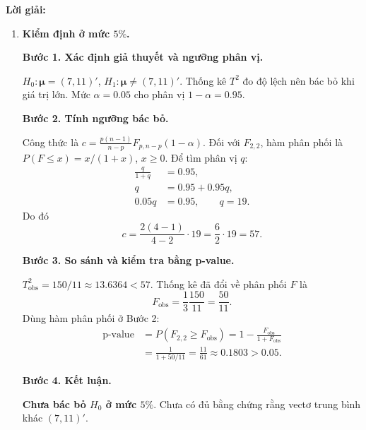 \documentclass[11pt,a4paper]{article}
\renewcommand{\boldsymbol}[1]{\symbf{#1}}
\newenvironment{solution}{%
  \par\medskip\noindent\textbf{Lời giải:}\par\nobreak\smallskip\noindent\ignorespaces
}{\par}
\newcommand{\answer}[1]{\boxed{#1}}
\newcommand{\step}[2]{\par\medskip\noindent\textbf{Bước #1. #2}\par\nopagebreak[4]\smallskip\noindent}
\begin{document}
\begin{solution}
\begin{enumerate}[label=\textbf{\alph*)}]
\begin{align*}
\frac{n-p}{p(n-1)}&=\frac26=\frac13.
\end{align*}
\step{3}{Kết luận.}
\[
\answer{\frac{T^2}{3}\sim F_{2,2}\quad\text{khi }H_0\text{ đúng}.}
\]
\item \textbf{Kiểm định ở mức $5\%$.}\par\nopagebreak[4]
\step{1}{Xác định giả thuyết và ngưỡng phân vị.}
$H_0:\boldsymbol{\mu}=(7,11)'$, $H_1:\boldsymbol{\mu}\ne(7,11)'$.
Thống kê $T^2$ đo độ lệch nên bác bỏ khi giá trị lớn.
Mức $\alpha=0.05$ cho phân vị $1-\alpha=0.95$.
\step{2}{Tính ngưỡng bác bỏ.}
Công thức là $c=\frac{p(n-1)}{n-p}F_{p,n-p}(1-\alpha)$.
Đối với $F_{2,2}$, hàm phân phối là $P(F\le x)=x/(1+x)$, $x\ge0$.
Để tìm phân vị $q$:
\begin{align*}
\frac{q}{1+q}&=0.95,\\
q&=0.95+0.95q,\\
0.05q&=0.95,\qquad q=19.
\end{align*}
Do đó
\[
c=\frac{2(4-1)}{4-2}\cdot19=\frac62\cdot19=57.
\]
\step{3}{So sánh và kiểm tra bằng p-value.}
$T^2_{\mathrm{obs}}=150/11\approx13.6364<57$.
Thống kê đã đổi về phân phối $F$ là
\[
F_{\mathrm{obs}}=\frac13\frac{150}{11}=\frac{50}{11}.
\]
Dùng hàm phân phối ở Bước 2:
\begin{align*}
\text{p-value}&=P(F_{2,2}\ge F_{\mathrm{obs}})
=1-\frac{F_{\mathrm{obs}}}{1+F_{\mathrm{obs}}}\\
&=\frac1{1+50/11}=\frac{11}{61}\approx0.1803>0.05.
\end{align*}
\step{4}{Kết luận.}
\textbf{Chưa bác bỏ $H_0$ ở mức $5\%$}. Chưa có đủ bằng chứng rằng
vectơ trung bình khác $(7,11)'$.
\end{enumerate}
\end{solution}
\end{document}
